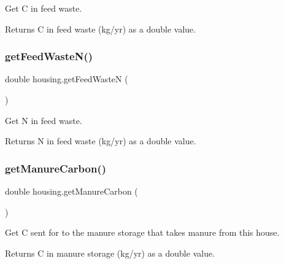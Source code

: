 Get C in feed waste. 

\begin{DoxyReturn}{Returns}
C in feed waste (kg/yr) as a double value. 
\end{DoxyReturn}
\mbox{\label{classhousing_ae8a214a1856077d2e02faa1be7d38e81}} 
\subsubsection{\texorpdfstring{getFeedWasteN()}{getFeedWasteN()}}
{\footnotesize\ttfamily double housing.\+get\+Feed\+WasteN (\begin{DoxyParamCaption}{ }\end{DoxyParamCaption})\hspace{0.3cm}{\ttfamily [inline]}}



Get N in feed waste. 

\begin{DoxyReturn}{Returns}
N in feed waste (kg/yr) as a double value. 
\end{DoxyReturn}
\mbox{\label{classhousing_aa1b989203ae13ab9cc37388e86039857}} 
\subsubsection{\texorpdfstring{getManureCarbon()}{getManureCarbon()}}
{\footnotesize\ttfamily double housing.\+get\+Manure\+Carbon (\begin{DoxyParamCaption}{ }\end{DoxyParamCaption})\hspace{0.3cm}{\ttfamily [inline]}}



Get C sent for to the manure storage that takes manure from this house. 

\begin{DoxyReturn}{Returns}
C in manure storage (kg/yr) as a double value. 
\end{DoxyReturn}
\mbox{\label{classhousing_aa33ebd3c77c96f5b100769c79dc88ecb}} 
